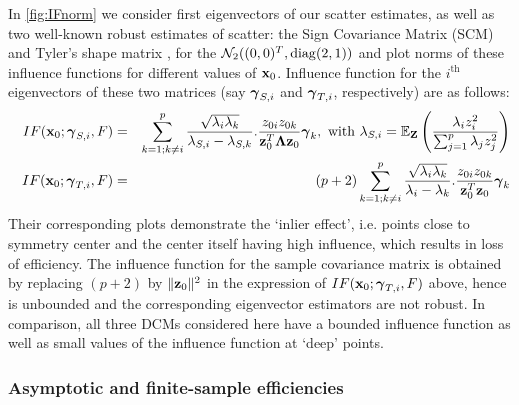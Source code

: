 In \ref{fig:IFnorm} we consider first eigenvectors of our scatter estimates, as well as two well-known robust estimates of scatter: the Sign Covariance Matrix (SCM) \citep{taskinen12} and Tyler's shape matrix \citep{tyler87}, for the $\mathcal{N}_2((0,0)^T, \operatorname*{diag}(2,1))$ and plot norms of these influence functions for different values of ${\bf{x}}_0$. Influence function for the $i^\text{th}$ eigenvectors of these two matrices (say ${\boldsymbol{\gamma}}_{S,i}$ and ${\boldsymbol{\gamma}}_{T,i}$, respectively) are as follows:
%
\begin{eqnarray*}
\quad IF({\bf{x}}_0; {\boldsymbol{\gamma}}_{S,i}, F) &=& \sum_{k=1; k \neq i}^p \frac{\sqrt{\lambda_i \lambda_k}}{\lambda_{S,i} - \lambda_{S,k}}. \frac{z_{0i} z_{0k}}{{\bf{z}}_0^T {\boldsymbol{\Lambda}} {\bf{z}}_0} {\boldsymbol{\gamma}}_k, \text{ with } \lambda_{S,i} = {\mathbb{E}}_{\mathbf{Z}} \left( \frac{\lambda_i z_i^2}{\sum_{j=1}^p \lambda_j z_j^2} \right) \\
IF({\bf{x}}_0; {\boldsymbol{\gamma}}_{T,i}, F) &=& (p+2) \sum_{k=1; k \neq i}^p \frac{\sqrt{\lambda_i \lambda_k}}{\lambda_i - \lambda_k}. \frac{z_{0i} z_{0k}}{{\bf{z}}_0^T {\bf{z}}_0} {\boldsymbol{\gamma}}_k 
\end{eqnarray*}
%
Their corresponding plots demonstrate the `inlier effect', i.e. points close to symmetry center and the center itself having high influence, which results in loss of efficiency. The influence function for the sample covariance matrix is obtained by replacing $(p+2)$ by $\| {\bf{z}}_0 \|^2$ in the expression of $IF({\bf{x}}_0; {\boldsymbol{\gamma}}_{T,i}, F)$ above, hence is unbounded and the corresponding eigenvector estimators are not robust. In comparison, all three DCMs considered here have a bounded influence function as well as small values of the influence function at `deep' points.

\subsubsection{Asymptotic and finite-sample efficiencies}


